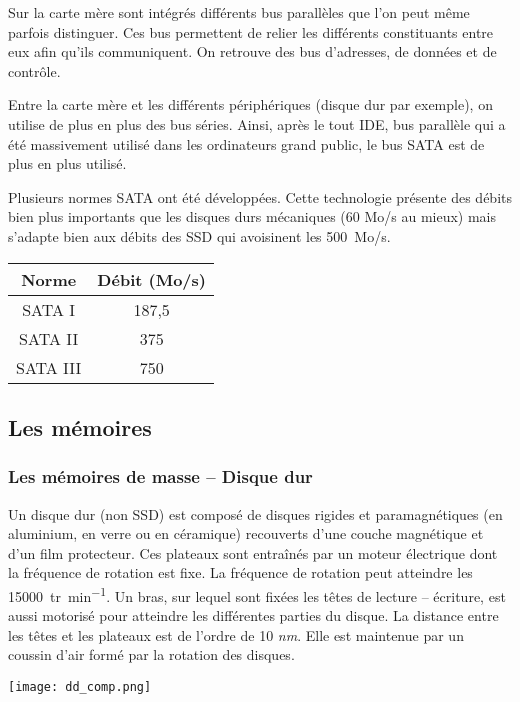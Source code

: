 	
Sur la carte mère sont intégrés différents bus parallèles que l'on peut même parfois distinguer. Ces bus permettent de relier les différents constituants entre eux afin qu'ils communiquent. On retrouve des bus d'adresses, de données et de contrôle.

Entre la carte mère et les différents périphériques (disque dur par exemple), on utilise de plus en plus des bus séries. Ainsi, après le tout IDE, bus parallèle qui a été massivement utilisé dans les ordinateurs grand public, le bus SATA est de plus en plus utilisé. 
\vspace{.25cm}


\noindent \begin{minipage}[c]{.7\linewidth}
Plusieurs normes SATA ont été développées. 
Cette technologie présente des débits bien plus importants que les disques durs mécaniques  (60 Mo/s au mieux) mais s'adapte bien aux débits des SSD qui avoisinent les \SI{500}{Mo/s}.
\end{minipage} \hfill
\begin{minipage}[c]{.29\linewidth}
\begin{center}
\begin{tabular}{|c|c|}
\hline
Norme & Débit (Mo/s) \\
\hline
SATA I & 187,5 \\ \hline
SATA II & 375 \\ \hline
SATA III & 750 \\ \hline
\end{tabular}
\end{center}
\end{minipage}



\subsection{Les mémoires}
\subsubsection{Les mémoires de masse -- Disque dur}

\begin{minipage}[c]{.6\linewidth}
Un disque dur (non SSD) est composé de disques rigides et paramagnétiques (en aluminium, en verre ou en céramique) recouverts d'une couche magnétique et d'un film protecteur. Ces plateaux sont entraînés par un moteur électrique dont la fréquence de rotation est fixe. La fréquence de rotation peut atteindre les \SI{15 000}{tr.min^{-1}}. Un bras, sur lequel sont fixées les têtes de lecture -- écriture, est aussi motorisé pour atteindre les différentes parties du disque. La distance entre les têtes et les plateaux est de l'ordre de 10 \textit{nm}. Elle est maintenue par un coussin d'air formé par la rotation des disques. 
\end{minipage} \hfill
\begin{minipage}[c]{.35\linewidth}
\begin{center}
\texttt{[image: dd\_comp.png]}
\end{center}
\end{minipage} 

